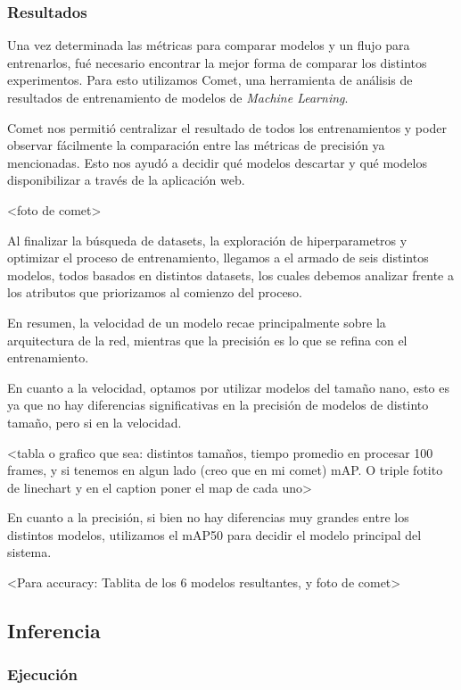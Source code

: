 \documentclass[a4paper]{article}
\begin{document}
\subsubsection{Resultados}

Una vez determinada las métricas para comparar modelos y un flujo para entrenarlos, fué necesario encontrar la mejor forma de comparar los distintos experimentos. Para esto utilizamos Comet, una herramienta de análisis de resultados de entrenamiento de modelos de \textit{Machine Learning}.

Comet nos permitió centralizar el resultado de todos los entrenamientos y poder observar fácilmente la comparación entre las métricas de precisión ya mencionadas. Esto nos ayudó a decidir qué modelos descartar y qué modelos disponibilizar a través de la aplicación web.

<foto de comet>

Al finalizar la búsqueda de datasets, la exploración de hiperparametros y optimizar el proceso de entrenamiento, llegamos a el armado de seis distintos modelos, todos basados en distintos datasets, los cuales debemos analizar frente a los atributos que priorizamos al comienzo del proceso.

En resumen, la velocidad de un modelo recae principalmente sobre la arquitectura de la red, mientras que la precisión es lo que se refina con el entrenamiento.

En cuanto a la velocidad, optamos por utilizar modelos del tamaño nano, esto es ya que no hay diferencias significativas en la precisión de modelos de distinto tamaño, pero si en la velocidad.

<tabla o grafico que sea: distintos tamaños, tiempo promedio en procesar 100 frames, y si tenemos en algun lado (creo que en mi comet) mAP. O triple fotito de linechart y en el caption poner el map de cada uno>

En cuanto a la precisión, si bien no hay diferencias muy grandes entre los distintos modelos, utilizamos el mAP50 para decidir el modelo principal del sistema.

<Para accuracy: Tablita de los 6 modelos resultantes, y foto de comet>

\subsection{Inferencia}

\subsubsection{Ejecución}
\end{document}
